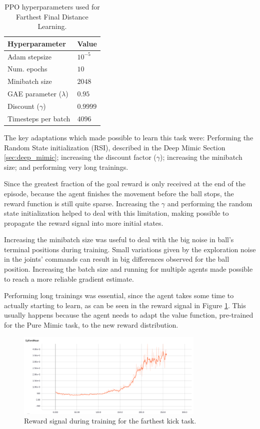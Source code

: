 \begin{table}[ht]
    \begin{tabular}{|l|l|}
    \hline
    Hyperparameter            & Value    \\  \hline
    Adam stepsize             & $10^{-5}$ \\
    Num. epochs               & $10$     \\
    Minibatch size            & $2048$     \\
    GAE parameter ($\lambda$) & $0.95$   \\
    Discount ($\gamma$)       & $0.9999$ \\
    Timesteps per batch       & $4096$   \\ \hline
    \end{tabular}
\centering
\caption{PPO hyperparameters used for Farthest Final Distance Learning.}
\label{tab:ppo_far_kick}
\end{table}

The key adaptations which made possible to learn this task were: Performing the Random State initialization (RSI), described in the Deep Mimic Section \ref{sec:deep_mimic}; increasing the discount factor ($\gamma$); increasing the minibatch size; and performing very long trainings.

Since the greatest fraction of the goal reward is only received at the end of the episode, because the agent finishes the movement before the ball stops, the reward function is still quite sparse. Increasing the $\gamma$ and performing the random state initialization helped to deal with this limitation, making possible to propagate the reward signal into more initial states.

Increasing the minibatch size was useful to deal with the big noise in ball's terminal positions during training. Small variations given by the exploration noise in the joints' commands can result in big differences observed for the ball position. Increasing the batch size and running for multiple agents made possible to reach a more reliable gradient estimate.

Performing long trainings was essential, since the agent takes some time to actually starting to learn, as can be seen in the reward signal in Figure \ref{fig:RL_far_kick}. This usually happens because the agent needs to adapt the value function, pre-trained for the Pure Mimic task, to the new reward distribution.

\begin{figure}[H]
    \centering
    \includegraphics[width=0.8\textwidth]{Chapter7/figures/rew_mean_far_kick.png} 
    \caption{Reward signal during training for the farthest kick task.}
    \label{fig:RL_far_kick}
\end{figure}

